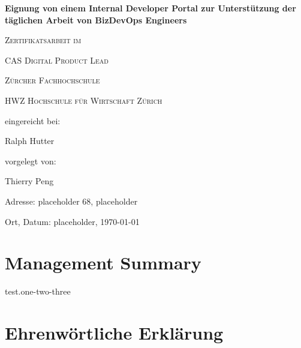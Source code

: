 \documentclass[a4paper,12pt]{article}
\begin{document}
    \begin{titlepage}
        \begin{center}
        {\huge\bfseries Eignung von einem Internal Developer Portal zur Unterstützung der täglichen Arbeit von BizDevOps Engineers\par}
            \vspace{2cm}

            {\scshape\large Zertifikatsarbeit im \par}
            {\scshape\large CAS Digital Product Lead \par}
            \vspace{1cm}

            {\scshape\large Zürcher Fachhochschule \par}
            {\scshape\large HWZ Hochschule für Wirtschaft Zürich \par}
            \vspace{4cm}

            {\normalsize eingereicht bei:\par}
            \vspace{0.5cm}

            {\large Ralph Hutter\par}
            \vfill
            {\normalsize vorgelegt von:\par}
            \vspace{0.5cm}
            {\large Thierry Peng\par}
            \vspace{0.5cm}
            {\normalsize Adresse: placeholder 68, placeholder\par}
            {\normalsize  Ort, Datum: placeholder, \today\par}

        \end{center}
    \end{titlepage}


    \section*{Management Summary}

    test.one-two-three
    \cite{backstageio}
    \pagebreak


    \tableofcontents
    \pagebreak


    \section*{Ehrenwörtliche Erklärung}
\end{document}
